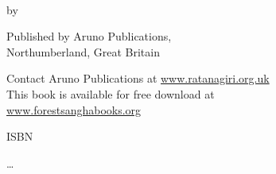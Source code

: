 \cleartoverso
\thispagestyle{empty}
{\copyrightsize\setlength{\parskip}{0.5\baselineskip}\setlength{\parindent}{0em}%
\raggedright%
\shaker\color[gray]{0.3}

\thetitle\\
by \theauthor

Published by Aruno Publications,\\
Northumberland, Great Britain

Contact Aruno Publications at \href{http://ratanagiri.org.uk/}{www.ratanagiri.org.uk}\\
This book is available for free download at\\
\href{http://forestsanghabooks.org/}{www.forestsanghabooks.org}

ISBN \theISBN

\ldots

%
%
%
%
%
%
%
%
}

